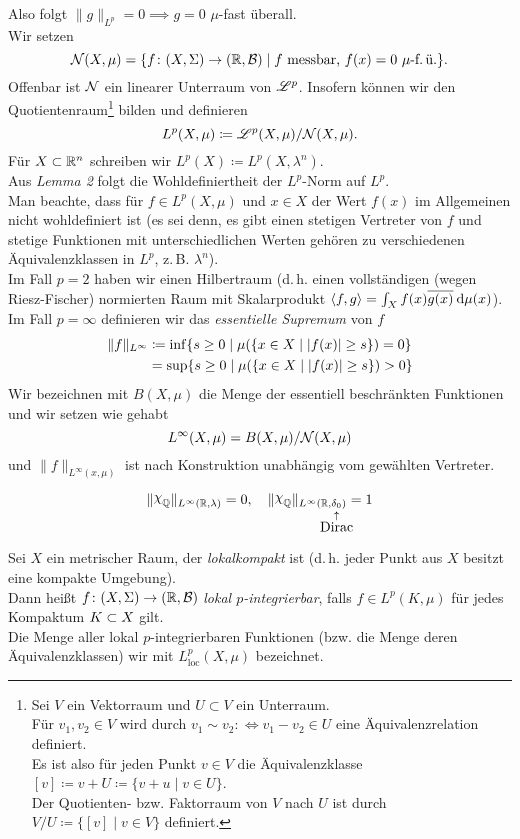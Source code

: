 \documentclass[skript.tex]{subfiles}
\begin{document}
	Also folgt $\lVert g \rVert_{L^p} = 0 \implies g = 0$ $\mu$-fast überall.\\
	Wir setzen
	\[
		\mathcal{N}(X,\mu) = \{f \colon (X,\Sigma) \to (\mathbb{R},\mathcal{B}) \mid f \text{ messbar, } f(x)=0 \text{ $\mu$-f.\,ü.} \}.
	\]
	Offenbar ist $\mathcal{N}$ ein linearer Unterraum von $\mathscr{L}^p$. Insofern können wir den Quotientenraum\footnote{
		Sei $V$ ein Vektorraum und $U \subset V$ ein Unterraum.\\
		Für $v_1, v_2 \in V$ wird durch $v_1 \sim v_2 :\Longleftrightarrow v_1-v_2 \in U$ eine Äquivalenzrelation definiert.\\
		Es ist also für jeden Punkt $v \in V$ die Äquivalenzklasse $[v] \coloneqq v+U \coloneqq \{v+u \mid v \in U \}$. \\
		Der Quotienten- bzw. Faktorraum von $V$ nach $U$ ist durch $V/U \coloneqq \{[v] \mid v \in V\}$ definiert.
	} bilden und definieren
	\[
		L^p(X,\mu) \coloneqq \mathscr{L}^p(X,\mu) / \mathcal{N}(X,\mu).
	\]
	Für $X \subset \mathbb{R}^n$ schreiben wir $L^p(X) \coloneqq L^p(X,\lambda^n)$.\\
	Aus \emph{Lemma 2} folgt die Wohldefiniertheit der $L^p$-Norm auf $L^p$.\\ Man beachte, dass für $f \in L^p(X,\mu)$ und $x \in X$ der Wert $f(x)$ im Allgemeinen nicht wohldefiniert ist (es sei denn, es gibt einen stetigen Vertreter von $f$ und stetige Funktionen mit unterschiedlichen Werten gehören zu verschiedenen Äquivalenzklassen in $L^p$, z.\,B. $\lambda^n$).\medskip\\
	Im Fall $p=2$ haben wir einen Hilbertraum (d.\,h. einen vollständigen (wegen Riesz-Fischer) normierten Raum mit Skalarprodukt $\langle f,g\rangle = \int_X f(x) \overline{g(x)} \: \mathrm{d} \mu(x)$). \\
	Im Fall $p=\infty$ definieren wir das \emph{essentielle Supremum} von $f$
	\begin{align*}
		\lVert f \rVert_{L^\infty} &\coloneqq \inf\{s \geq 0 \mid \mu(\{x \in X \mid |f(x)| \geq s \}) = 0 \} \\
		&= \sup\{s \geq 0 \mid \mu(\{x \in X \mid |f(x)| \geq s \}) > 0 \}
	\end{align*}
	Wir bezeichnen mit $B(X,\mu)$ die Menge der essentiell beschränkten Funktionen und wir setzen wie gehabt
	\[
	L^\infty(X,\mu) = B(X,\mu) / \mathcal{N}(X,\mu)
	\]
	und $\lVert f \rVert_{L^\infty(x,\mu)}$ ist nach Konstruktion unabhängig vom gewählten Vertreter.
	\begin{bsp}
		\[
			\lVert \rchi_\mbb{Q} \rVert_{L^\infty(\mbb{R},\lambda)} = 0, \quad
			\lVert \rchi_\mbb{Q} \rVert_{L^\infty(\mbb{R},\underset{\displaystyle\mathclap{\overset{\uparrow}{\text{Dirac}}}}{\delta_0})} = 1
 		\]
	\end{bsp}
	Sei $X$ ein metrischer Raum, der \emph{lokalkompakt} ist (d.\,h. jeder Punkt aus $X$ besitzt eine kompakte Umgebung).\\
	Dann heißt $f \colon (X,\Sigma) \to (\mathbb{R},\mathcal{B})$ \emph{lokal $p$-integrierbar}, falls $f \in L^p(K,\mu)$ für jedes Kompaktum $K \subset X$ gilt. \\
	Die Menge aller lokal $p$-integrierbaren Funktionen (bzw. die Menge deren Äquivalenzklassen) wir mit $L_\text{loc}^p(X,\mu)$ bezeichnet.
	
\end{document}
